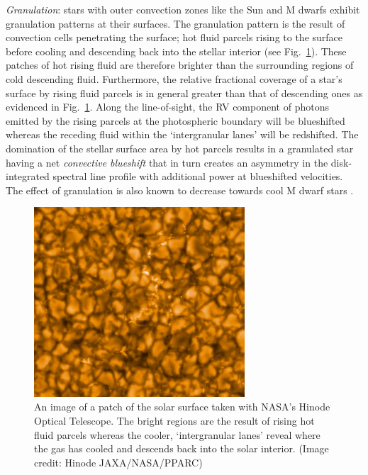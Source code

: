 \emph{Granulation}:
stars with outer convection zones like the Sun and M dwarfs exhibit granulation patterns
at their surfaces. The granulation pattern is the result
of convection cells penetrating the surface; hot fluid parcels rising to the surface before
cooling and descending back into the stellar interior (see Fig.~\ref{fig:granulation}).
These patches of hot rising fluid are therefore brighter than the surrounding regions of cold
descending fluid. Furthermore, the relative fractional coverage of a star's surface by rising
fluid parcels is in general greater than that of descending ones as evidenced in
Fig.~\ref{fig:granulation}.
Along the line-of-sight, the RV component of photons emitted by the rising parcels at the
photospheric boundary will be blueshifted whereas the receding fluid within the
`intergranular lanes' will be redshifted. The domination of the stellar
surface area by hot parcels results in a granulated star having a net \emph{convective
  blueshift} that in turn creates an asymmetry in the disk-integrated spectral line profile
with additional power at blueshifted velocities. The effect of granulation is also known
to decrease towards cool M dwarf stars \citep{dumusque11a,meunier17}. \\

\begin{figure}
  \centering
  \includegraphics[width=0.7\textwidth]{figures/solargranulation.jpg}
  \caption[Close-in view of the convection cells on the solar surface.]
      {An image of a patch of the solar surface taken with NASA's Hinode Optical
    Telescope. The bright regions are the result of rising hot fluid parcels whereas the cooler,
    `intergranular lanes' reveal where the gas has cooled and descends back into the solar
    interior. (Image credit: Hinode JAXA/NASA/PPARC)}
  \label{fig:granulation}
\end{figure}


